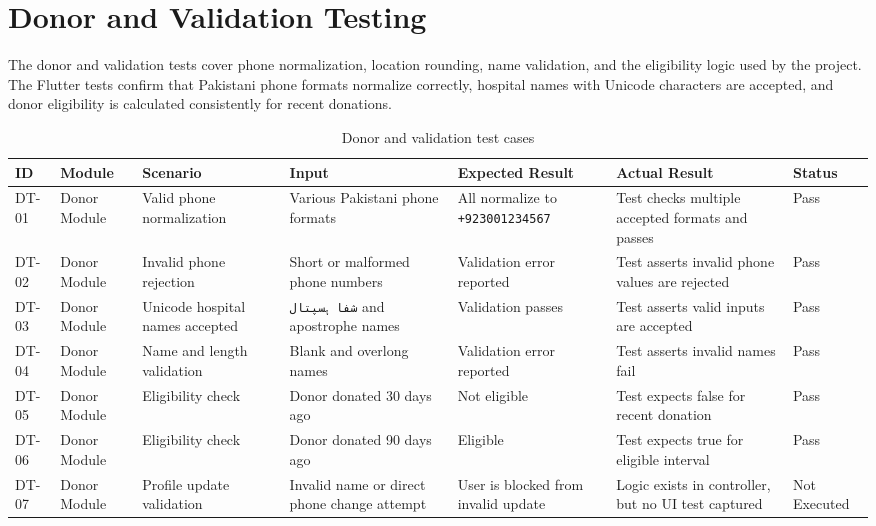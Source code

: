 
\section{Donor and Validation Testing}

The donor and validation tests cover phone normalization, location rounding, name validation, and the eligibility logic used by the project. The Flutter tests confirm that Pakistani phone formats normalize correctly, hospital names with Unicode characters are accepted, and donor eligibility is calculated consistently for recent donations.

\begin{table}[H]
\centering
\caption{Donor and validation test cases}
\begin{tabularx}{\textwidth}{|p{1.6cm}|p{2.7cm}|X|X|X|p{1.6cm}|p{2.5cm}|}
\hline
\textbf{ID} & \textbf{Module} & \textbf{Scenario} & \textbf{Input} & \textbf{Expected Result} & \textbf{Actual Result} & \textbf{Status} \\
\hline
DT-01 & Donor Module & Valid phone normalization & Various Pakistani phone formats & All normalize to \texttt{+923001234567} & Test checks multiple accepted formats and passes & Pass \\
\hline
DT-02 & Donor Module & Invalid phone rejection & Short or malformed phone numbers & Validation error reported & Test asserts invalid phone values are rejected & Pass \\
\hline
DT-03 & Donor Module & Unicode hospital names accepted & \texttt{شفا ہسپتال} and apostrophe names & Validation passes & Test asserts valid inputs are accepted & Pass \\
\hline
DT-04 & Donor Module & Name and length validation & Blank and overlong names & Validation error reported & Test asserts invalid names fail & Pass \\
\hline
DT-05 & Donor Module & Eligibility check & Donor donated 30 days ago & Not eligible & Test expects false for recent donation & Pass \\
\hline
DT-06 & Donor Module & Eligibility check & Donor donated 90 days ago & Eligible & Test expects true for eligible interval & Pass \\
\hline
DT-07 & Donor Module & Profile update validation & Invalid name or direct phone change attempt & User is blocked from invalid update & Logic exists in controller, but no UI test captured & Not Executed \\
\hline
\end{tabularx}
\end{table}

